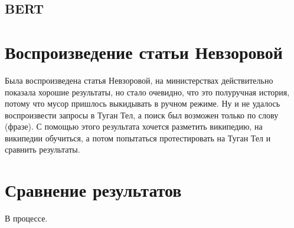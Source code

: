 \subsection{BERT}




\section{Воспроизведение статьи Невзоровой}

Была воспроизведена статья Невзоровой, на министерствах действительно показала хорошие результаты, но стало очевидно, что это полуручная история, потому что мусор пришлось выкидывать в ручном режиме. Ну и не удалось воспроизвести запросы в Туган Тел, а поиск был возможен только по слову (фразе). С помощью этого результата хочется разметить википедию, на википедии обучиться, а потом попытаться протестировать на Туган Тел и сравнить результаты.

\section{Сравнение результатов}

В процессе.


